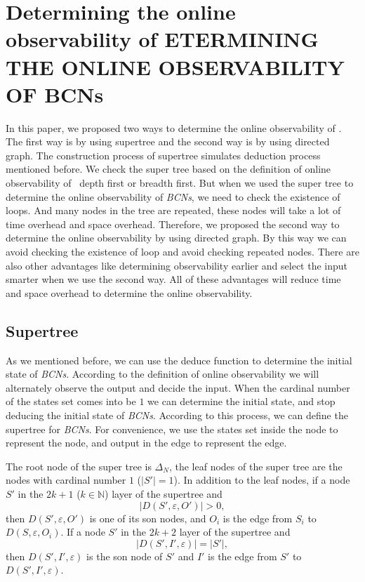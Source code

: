 \section{Determining the online observability of  ETERMINING THE ONLINE OBSERVABILITY OF BCNs}
\label{sec:deter}
In this paper, we proposed two ways to determine the online observability of \BCNs. The first way is by using supertree and the second way is by using directed graph. The construction process of supertree simulates deduction process mentioned before. We check the super tree based on the definition of online observability of \BCNs\ depth first or breadth first. But when we used the super tree to determine the online observability of {\em BCNs}, we need to check the existence of loops. And many nodes in the tree are repeated, these nodes will take a lot of time overhead and space overhead. Therefore, we proposed the second way to determine the online observability by using directed graph. By this way we can avoid checking the existence of loop and avoid checking repeated nodes. There are also other advantages like determining observability earlier and select the input smarter when we use the second way. All of these advantages will reduce time and space overhead to determine the online observability.    

\subsection{Supertree} As we mentioned before, we can use the deduce function to determine the initial state of {\em BCNs}. According to the definition of online observability we will alternately observe the output and decide the input. When the  cardinal number of the states set comes into be $1$ we can determine the initial state, and stop deducing the initial state of {\em BCNs}. According to this process, we can define the supertree for {\em BCNs}. For convenience, we use the states set inside the node to represent the node, and output in the edge to represent the edge.
\begin{definition}
The root node of the super tree is $\Delta_N$, the leaf nodes of the super tree are the nodes with cardinal number $1$ ($|S'|=1$). In addition to the leaf nodes, if a node $S'$ in the $2k + 1$ ($k\in \mathbb{N}$) layer of the supertree and 
\[|D\left(S',\varepsilon, O'\right)|>0,\]
 then $D\left(S',\varepsilon, O'\right)$ is one of its son nodes, and $O_i$ is the edge from $S_i$ to $D\left(S,\varepsilon, O_i\right)$. If a node $S'$ in the $2k+2$ layer of the supertree and  
\[|D\left(S',I',\varepsilon\right)|=|S'|,\] 
then $D\left(S',I',\varepsilon\right)$ is the son node of $S'$ and $I'$ is the edge from $S'$ to $D\left(S',I',\varepsilon\right)$. 
\end{definition}

